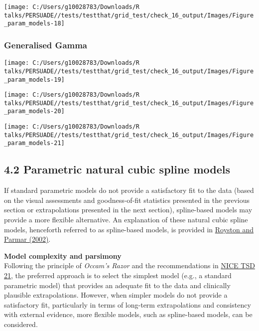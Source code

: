 \documentclass[
]{article}
\begin{document}
\begin{flushleft}\texttt{[image: C:/Users/g10028783/Downloads/R talks/PERSUADE//tests/testthat/grid\_test/check\_16\_output/Images/Figure\_param\_models-18]} \end{flushleft}

\clearpage

\subsubsection{Generalised Gamma}\label{generalised-gamma}

\begin{flushleft}\texttt{[image: C:/Users/g10028783/Downloads/R talks/PERSUADE//tests/testthat/grid\_test/check\_16\_output/Images/Figure\_param\_models-19]} \end{flushleft}

\begin{flushleft}\texttt{[image: C:/Users/g10028783/Downloads/R talks/PERSUADE//tests/testthat/grid\_test/check\_16\_output/Images/Figure\_param\_models-20]} \end{flushleft}

\begin{flushleft}\texttt{[image: C:/Users/g10028783/Downloads/R talks/PERSUADE//tests/testthat/grid\_test/check\_16\_output/Images/Figure\_param\_models-21]} \end{flushleft}

\clearpage

\subsection{4.2 Parametric natural cubic spline
models}\label{parametric-natural-cubic-spline-models}

If standard parametric models do not provide a satisfactory fit to the
data (based on the visual assessments and goodness-of-fit statistics
presented in the previous section or extrapolations presented in the
next section), spline-based models may provide a more flexible
alternative. An explanation of these natural cubic spline models,
henceforth referred to as spline-based models, is provided in
\href{https://doi.org/10.1002/sim.1203}{Royston and Parmar (2002)}.

\textbf{Model complexity and parsimony}\\
Following the principle of \emph{Occam's Razor} and the recommendations
in
\href{https://www.sheffield.ac.uk/media/34188/download?attachment}{NICE
TSD 21}, the preferred approach is to select the simplest model (e.g., a
standard parametric model) that provides an adequate fit to the data and
clinically plausible extrapolations. However, when simpler models do not
provide a satisfactory fit, particularly in terms of long-term
extrapolations and consistency with external evidence, more flexible
models, such as spline-based models, can be considered.
\end{document}
